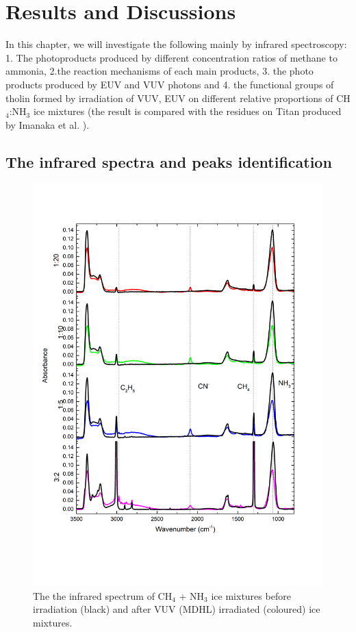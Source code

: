 \chapter{\protect Results and Discussions}
\label{results}
In this chapter, we will investigate the following mainly by infrared spectroscopy: 1. The photoproducts produced by different concentration ratios of methane to ammonia, 2.the reaction mechanisms of each main products, 3. the photo products produced by EUV and VUV photons and 4. the functional groups of tholin formed by irradiation of VUV, EUV on different relative proportions of CH$_4$:NH$_3$ ice mixtures (the result is compared with the residues on Titan produced by Imanaka et al. \cite{imanaka2004laboratory}).

\section{The infrared spectra and peaks identification}
\begin{figure}
\centering
\includegraphics[width=\textwidth]{figures/chapter3/widerange.png}
\caption{The the infrared spectrum of CH$_4$ + NH$_3$ ice mixtures before irradiation (black) and after VUV (MDHL) irradiated (coloured) ice mixtures. }
\label{fig:widerange}
\end{figure}

